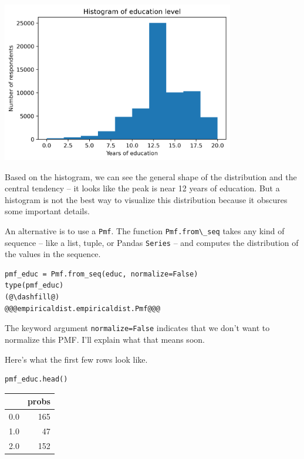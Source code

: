 \begin{center}
\includegraphics[width=4in]{chapters/08_distributions_files/08_distributions_34_0.png}
\end{center}

Based on the histogram, we can see the general shape of the distribution
and the central tendency -- it looks like the peak is near 12 years of
education. But a histogram is not the best way to visualize this
distribution because it obscures some important details.

An alternative is to use a \passthrough{\lstinline!Pmf!}. The function
\passthrough{\lstinline!Pmf.from\_seq!} takes any kind of sequence --
like a list, tuple, or Pandas \passthrough{\lstinline!Series!} -- and
computes the distribution of the values in the sequence.

\begin{lstlisting}[]
pmf_educ = Pmf.from_seq(educ, normalize=False)
type(pmf_educ)
(@\dashfill@)
@@@empiricaldist.empiricaldist.Pmf@@@
\end{lstlisting}

The keyword argument \passthrough{\lstinline!normalize=False!} indicates
that we don't want to normalize this PMF. I'll explain what that means
soon.

Here's what the first few rows look like.

\begin{lstlisting}[]
pmf_educ.head()
\end{lstlisting}

\begin{tabular}{lr}
\midrule
{} &  probs \\
\midrule
0.0 &    165 \\
1.0 &     47 \\
2.0 &    152 \\
\midrule
\end{tabular}

